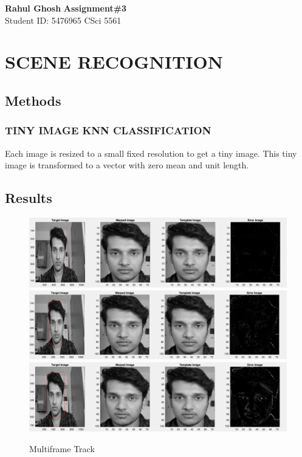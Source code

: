 \documentclass[letter, 10pt]{article}
\begin{document}
\noindent
\large \textbf{Rahul Ghosh} \hfill \textbf{Assignment\#3}\\
\normalsize Student ID: 5476965 \hfill CSci 5561\\

\section*{SCENE RECOGNITION}
\subsection*{Methods}
\subsubsection*{TINY IMAGE KNN CLASSIFICATION}
Each image is resized to a small fixed resolution to get a tiny image. This tiny image is transformed to a vector with zero mean and unit length.


\subsection*{Results}

\begin{figure}[h]
        \centering
        \includegraphics[width=\textwidth]{HW2/RESULT/FRAME1.png}
    \endminipage\hfill
        \centering
        \includegraphics[width=\textwidth]{HW2/RESULT/FRAME2.png}
    \endminipage\hfill
        \centering
        \includegraphics[width=\textwidth]{HW2/RESULT/FRAME3.png}
    \endminipage\hfill
    \caption{Multiframe Track}
\end{figure}
\end{document}

